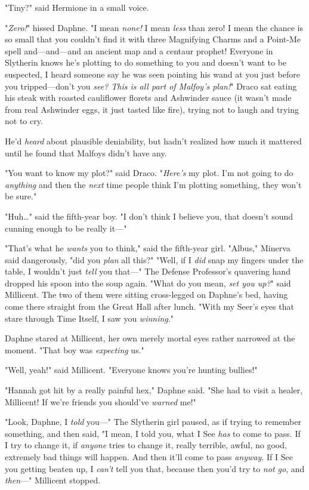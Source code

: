 "Tiny?" said Hermione in a small voice.

"\emph{Zero!}" hissed Daphne. "I mean \emph{none!} I mean \emph{less} than
zero! I mean the chance is so small that you couldn't find it with three
Magnifying Charms and a Point-Me spell and---and---and an ancient map and a
centaur prophet! Everyone in Slytherin knows he's plotting to do something to
you and doesn't want to be suspected, I heard someone say he was seen pointing
his wand at you just before you tripped---don't you \emph{see? This is all part
of Malfoy's plan!}"
\later
Draco sat eating his steak with roasted cauliflower florets and Ashwinder sauce
(it wasn't made from real Ashwinder eggs, it just tasted like fire), trying not
to laugh and trying not to cry.

He'd \emph{heard} about plausible deniability, but hadn't realized how much it
mattered until he found that Malfoys didn't have any.

"You want to know my plot?" said Draco. "\emph{Here's} my plot. I'm not going
to do \emph{anything} and then the \emph{next} time people think I'm plotting
something, they won't be sure."

"Huh{\ldots}" said the fifth-year boy. "I don't think I believe you, that
doesn't sound cunning enough to be really it---"

"That's what he \emph{wants} you to think," said the fifth-year girl.
\later
"Albus," Minerva said dangerously, "did you \emph{plan} all this?"
\later
"Well, if I \emph{did} snap my fingers under the table, I wouldn't just
\emph{tell} you that---"
\later
The Defense Professor's quavering hand dropped his spoon into the soup again.
\later
"What do you mean, \emph{set you up?}" said Millicent. The two of them were
sitting cross-legged on Daphne's bed, having come there straight from the Great
Hall after lunch. "With my Seer's eyes that stare through Time Itself, I saw
you \emph{winning}."

Daphne stared at Millicent, her own merely mortal eyes rather narrowed at the
moment. "That boy was \emph{expecting} us."

"Well, yeah!" said Millicent. "Everyone knows you're hunting bullies!"

"Hannah got hit by a really painful hex," Daphne said. "She had to visit a
healer, Millicent! If we're friends you should've \emph{warned} me!"

"Look, Daphne, I \emph{told} you---" The Slytherin girl paused, as if trying to
remember something, and then said, "I mean, I told you, what I See \emph{has}
to come to pass. If I try to change it, if \emph{anyone} tries to change it,
really terrible, awful, no good, extremely bad things will happen. And then
it'll come to pass \emph{anyway}. If I See you getting beaten up, I
\emph{can't} tell you that, because then you'd try to \emph{not go}, and
\emph{then}---" Millicent stopped.

